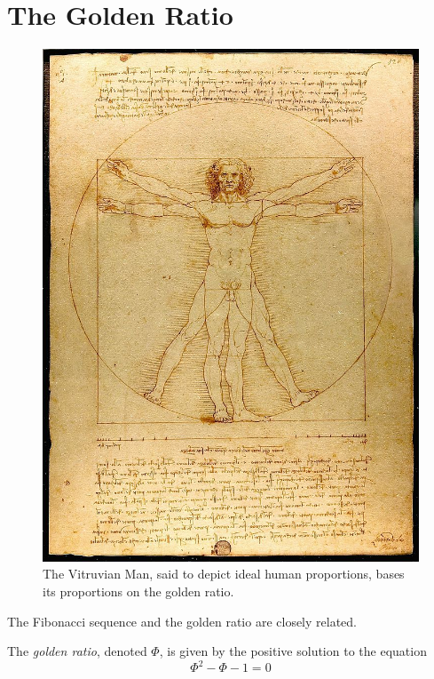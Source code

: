 \section{The Golden Ratio}

\begin{figure}[ht]
  \begin{center}
  \includegraphics{fibonacci/vitruvian.jpg}
  \end{center}
  \caption{The Vitruvian Man, said to depict ideal human proportions, bases its proportions on the golden ratio.\cite[p.~115]{design10}}
\end{figure}


The Fibonacci sequence and the golden ratio are closely related.

\begin{defn}
  The \emph{golden ratio}, denoted \( \Phi \), is given by the positive solution to the equation
\begin{equation}
  \Phi^2 - \Phi - 1 = 0
\end{equation}
\end{defn}

